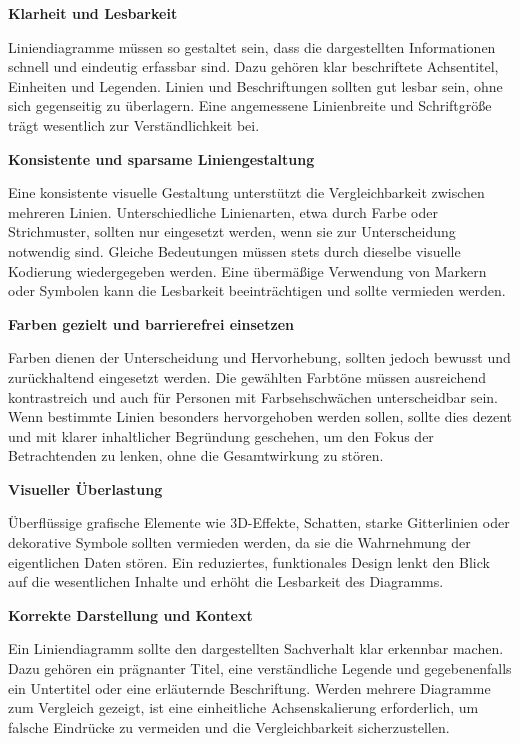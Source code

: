\item
\textbf{Klarheit und Lesbarkeit}

Liniendiagramme müssen so gestaltet sein, dass die dargestellten Informationen schnell und eindeutig erfassbar sind.
Dazu gehören klar beschriftete Achsentitel, Einheiten und Legenden.
Linien und Beschriftungen sollten gut lesbar sein, ohne sich gegenseitig zu überlagern.
Eine angemessene Linienbreite und Schriftgröße trägt wesentlich zur Verständlichkeit bei.

\item
\textbf{Konsistente und sparsame Liniengestaltung}

Eine konsistente visuelle Gestaltung unterstützt die Vergleichbarkeit zwischen mehreren Linien.
Unterschiedliche Linienarten, etwa durch Farbe oder Strichmuster, sollten nur eingesetzt werden, wenn sie zur Unterscheidung notwendig sind.
Gleiche Bedeutungen müssen stets durch dieselbe visuelle Kodierung wiedergegeben werden.
Eine übermäßige Verwendung von Markern oder Symbolen kann die Lesbarkeit beeinträchtigen und sollte vermieden werden.

\item
\textbf{Farben gezielt und barrierefrei einsetzen}

Farben dienen der Unterscheidung und Hervorhebung, sollten jedoch bewusst und zurückhaltend eingesetzt werden.
Die gewählten Farbtöne müssen ausreichend kontrastreich und auch für Personen mit Farbsehschwächen unterscheidbar sein.
Wenn bestimmte Linien besonders hervorgehoben werden sollen, sollte dies dezent und mit klarer inhaltlicher Begründung geschehen, um den Fokus der Betrachtenden zu lenken, ohne die Gesamtwirkung zu stören.

\item
\textbf{Visueller Überlastung}

Überflüssige grafische Elemente wie 3D-Effekte, Schatten, starke Gitterlinien oder dekorative Symbole sollten vermieden werden, da sie die Wahrnehmung der eigentlichen Daten stören.
Ein reduziertes, funktionales Design lenkt den Blick auf die wesentlichen Inhalte und erhöht die Lesbarkeit des Diagramms.

\item
\textbf{Korrekte Darstellung und Kontext}

Ein Liniendiagramm sollte den dargestellten Sachverhalt klar erkennbar machen.
Dazu gehören ein prägnanter Titel, eine verständliche Legende und gegebenenfalls ein Untertitel oder eine erläuternde Beschriftung.
Werden mehrere Diagramme zum Vergleich gezeigt, ist eine einheitliche Achsenskalierung erforderlich, um falsche Eindrücke zu vermeiden und die Vergleichbarkeit sicherzustellen.

